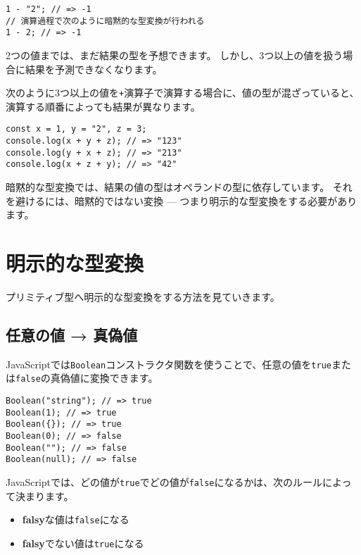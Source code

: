 \begin{lstlisting}
1 - "2"; // => -1
// 演算過程で次のように暗黙的な型変換が行われる
1 - 2; // => -1
\end{lstlisting}

2つの値までは、まだ結果の型を予想できます。
しかし、3つ以上の値を扱う場合に結果を予測できなくなります。

次のように3つ以上の値を\texttt{+}演算子で演算する場合に、値の型が混ざっていると、
演算する順番によっても結果が異なります。

\begin{lstlisting}
const x = 1, y = "2", z = 3;
console.log(x + y + z); // => "123"
console.log(y + x + z); // => "213"
console.log(x + z + y); // => "42"
\end{lstlisting}

暗黙的な型変換では、結果の値の型はオペランドの型に依存しています。
それを避けるには、暗黙的ではない変換 ---
つまり明示的な型変換をする必要があります。

\hypertarget{explicit-coercion}{%
\section{明示的な型変換}\label{explicit-coercion}}

プリミティブ型へ明示的な型変換をする方法を見ていきます。

\hypertarget{any-to-boolean}{%
\subsection{任意の値 → 真偽値}\label{any-to-boolean}}

JavaScriptでは\texttt{Boolean}コンストラクタ関数を使うことで、任意の値を\texttt{true}または\texttt{false}の真偽値に変換できます。

\begin{lstlisting}
Boolean("string"); // => true
Boolean(1); // => true
Boolean({}); // => true
Boolean(0); // => false
Boolean(""); // => false
Boolean(null); // => false
\end{lstlisting}

JavaScriptでは、どの値が\texttt{true}でどの値が\texttt{false}になるかは、次のルールによって決まります。

\begin{itemize}
\item
  \textbf{falsy}な値は\texttt{false}になる
\item
  \textbf{falsy}でない値は\texttt{true}になる
\end{itemize}

